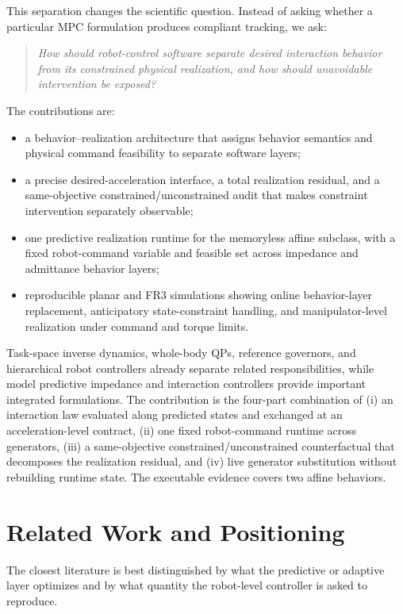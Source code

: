 \documentclass[journal]{IEEEtran}
\begin{document}
This separation changes the scientific question. Instead of asking
whether a particular MPC formulation produces compliant tracking, we ask:

\begin{quote}
\emph{How should robot-control software separate desired interaction
behavior from its constrained physical realization, and how should
unavoidable intervention be exposed?}
\end{quote}

The contributions are:
\begin{itemize}
\item a behavior--realization architecture that assigns behavior
semantics and physical command feasibility to separate software layers;
\item a precise desired-acceleration interface, a total realization
residual, and a same-objective constrained/unconstrained audit that makes
constraint intervention separately observable;
\item one predictive realization runtime for the memoryless affine
subclass, with a fixed robot-command variable and feasible set across
impedance and admittance behavior layers;
\item reproducible planar and FR3 simulations showing online
behavior-layer replacement, anticipatory state-constraint handling, and
manipulator-level realization under command and torque limits.
\end{itemize}

Task-space inverse dynamics, whole-body QPs, reference governors, and
hierarchical robot controllers already separate related responsibilities,
while model predictive impedance and
interaction controllers provide important integrated formulations. The
contribution is the four-part combination of (i) an interaction
law evaluated along predicted states and exchanged at an acceleration-level
contract, (ii) one fixed robot-command runtime across generators, (iii) a
same-objective constrained/unconstrained counterfactual that decomposes the
realization residual, and (iv) live generator substitution without rebuilding
runtime state. The executable evidence covers two affine behaviors.

\section{Related Work and Positioning}
\label{sec:related}

The closest literature is best distinguished by what the predictive or
adaptive layer optimizes and by what quantity the robot-level controller
is asked to reproduce.
\end{document}
